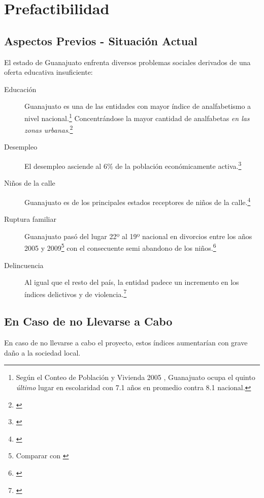 \section{Prefactibilidad}

\subsection{Aspectos Previos - Situación Actual}
\label{sub:Intro:AspectosPrevios}

El estado de Guanajuato enfrenta diversos problemas sociales derivados de una oferta educativa insuficiente:

\begin{description}
	\item[Educación] Guanajuato es una de las entidades con mayor índice de analfabetismo a nivel nacional.\footnote{Según el Conteo de Población y Vivienda 2005 \citep{Inegi2005}, Guanajuato ocupa el quinto \emph{último} lugar en escolaridad con 7.1 años en promedio contra 8.1 nacional.} Concentrándose la mayor cantidad de analfabetas \emph{en las zonas urbanas}.\footnote{\citep{Morales09}}
	\item[Desempleo] El desempleo asciende al 6\% de la población económicamente activa.\footnote{\citep{Inegi2010Enoe}}
	\item[Niños de la calle] Guanajuato es de los principales estados receptores de niños de la calle.\footnote{\citep{Morales09}}
	\item[Ruptura familiar]
	Guanajuato pasó del lugar 22º al 19º nacional en divorcios entre los años 2005 y 2009\footnote{Comparar \citep{Inegi2005pGto} con \citep{Inegi2009pGto}} con el consecuente semi abandono de los niños.\footnote{\citep{Morales09}}
	\item[Delincuencia] Al igual que el resto del país, la entidad padece un incremento en los índices delictivos y de violencia.\footnote{\citep{CIDE2010}}
\end{description}

\subsection{En Caso de no Llevarse a Cabo}

En caso de no llevarse a cabo el proyecto, estos índices aumentarían con grave daño a la sociedad local.

